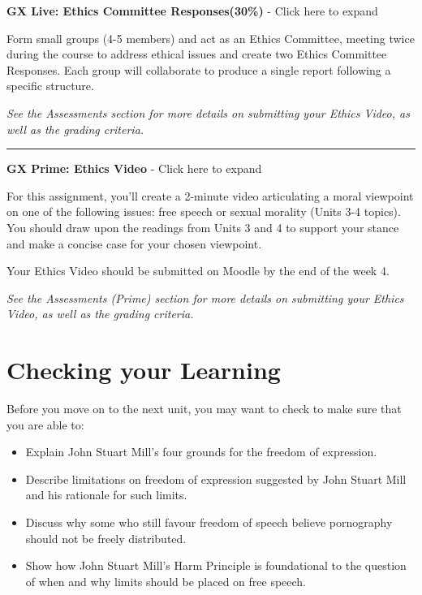 \documentclass[
]{book}
\providecommand{\tightlist}{%
  \setlength{\itemsep}{0pt}\setlength{\parskip}{0pt}}
\begin{document}
\begin{assessment}
\textbf{GX Live: Ethics Committee Responses(30\%)} - Click here to expand

Form small groups (4-5 members) and act as an Ethics Committee, meeting twice during the course to address ethical issues and create two Ethics Committee Responses. Each group will collaborate to produce a single report following a specific structure.

\emph{See the Assessments section for more details on submitting your Ethics Video, as well as the grading criteria.}

\begin{center}\rule{0.5\linewidth}{0.5pt}\end{center}

\textbf{GX Prime: Ethics Video} - Click here to expand

For this assignment, you'll create a 2-minute video articulating a moral viewpoint on one of the following issues: free speech or sexual morality (Units 3-4 topics). You should draw upon the readings from Units 3 and 4 to support your stance and make a concise case for your chosen viewpoint.

Your Ethics Video should be submitted on Moodle by the end of the week 4.

\emph{See the Assessments (Prime) section for more details on submitting your Ethics Video, as well as the grading criteria.}
\end{assessment}

\hypertarget{checking-your-learning-2}{%
\section*{Checking your Learning}\label{checking-your-learning-2}}

\begin{progress}
Before you move on to the next unit, you may want to check to make sure that you are able to:

\begin{itemize}
\tightlist
\item
  Explain John Stuart Mill's four grounds for the freedom of expression.
\item
  Describe limitations on freedom of expression suggested by John Stuart Mill and his rationale for such limits.
\item
  Discuss why some who still favour freedom of speech believe pornography should not be freely distributed.
\item
  Show how John Stuart Mill's Harm Principle is foundational to the question of when and why limits should be placed on free speech.
\end{itemize}
\end{progress}
\end{document}
